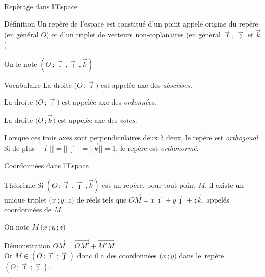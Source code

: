 \documentclass{cours}
\begin{document}
    \vspace{-0.7cm} %
    \begin{Gpartie}{Repèrage dans l'Espace} 
        \begin{Spartie}{Définition} 
            Un repère de l'espace est constitué d'un point appelé origine du repère (en général $O$) et d'un triplet de vecteurs non-coplanaires (en général $\vec{\imath}$, $\vec{\jmath}$ et $\vec{k}$)

            On le note $\left(O\,;\vec{\imath}\,,\vec{\jmath}\,,\vec{k}\right)$
        \end{Spartie}
        \begin{Spartie}{Vocabulaire} 
            La droite $\big(O\,;\vec{\imath}\big)$ est appelée axe des \emph{abscisses}.

            La droite $\big(O\,;\vec{\jmath}\big)$ est appelée axe des \emph{ordonnées}.

            La droite $\big(O\,;\vec{k}\big)$ est appelée axe des \emph{cotes}.

            Lorsque ces trois axes sont perpendiculaires deux à deux, le repère est \emph{orthogonal}. \\ Si de plus $\lvert\lvert\vec{\imath}\rvert\rvert=\lvert\lvert\vec{\jmath}\rvert\rvert=\lvert\lvert\vec{k}\rvert\rvert=1$, le repère est \emph{orthonormé}.
        \end{Spartie}
        \begin{Spartie}{Coordonnées dans l'Espace} 
            \begin{SSpartie}{Théorème} 
                Si $\left(O\,;\vec{\imath}\,,\vec{\jmath}\,,\vec{k}\right)$ est un repère, pour tout point $M$, il existe un unique triplet $\big(x\,; y\,; z\big)$ de réels tels que $\overrightarrow{OM}=x\vec{\imath}+y\vec{\jmath}+z\vec{k}$, appelés coordonnées de $M$.

                On note $M~\big(x\,;y\,;z\big)$
                \begin{SSSpartie}{Démonstration} 
                    $\overrightarrow{OM}=\overrightarrow{OM'}+\overrightarrow{M'M}$ \\
                    Or $M\in\left(O\,;\vec{\imath}\,;\vec{\jmath}\right)$ donc il a des coordonnées $\big(x\,; y\big)$ dans le~repère~$\left(O\,;\vec{\imath}\,;\vec{\jmath}\right)$.


\end{SSSpartie}
\end{SSpartie}
\end{Spartie}
\end{Gpartie}
\end{document}
